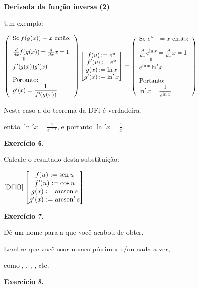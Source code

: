 \documentclass[oneside,12pt]{article}
\begin{document}
\newpage


{\bf Derivada da função inversa (2)}

Um exemplo:

\msk

$\scalebox{0.9}{$
  \DFID
  \bmat{ f(u):=e^u \\ f'(u):=e^u \\ g(x):=\ln x \\ g'(x):=\ln' x } =
  \left(
  \begin{array}{l}
  \text{Se $e^{\ln x}=x$ então:} \\[10pt]
  \frac{d}{dx} e^{\ln x} = \frac{d}{dx} x = 1 \\
  \phantom{mm}\veq \\
  e^{\ln x} \ln' x \\[10pt]
  \text{Portanto:} \\
  \ln' x = \D \frac{1}{e^{\ln x}} \\
  \end{array}
  \right)
  $}
$

\bsk

Neste caso a  do teorema da DFI é verdadeira,

então $\ln' x = \frac{1}{e^{\ln x}}$, e portanto $\ln' x = \frac 1x$.

\newpage


{\bf Exercício 6.}

Calcule o resultado desta substituição:

$\mathsf{[DFID]} \left [\begin{matrix}f(u) := \operatorname{sen} u \\ f'(u) := \cos u \\ g(x) := \operatorname{arcsen} s \\ g'(x) := \operatorname{arcsen}' s\end{matrix}\right ]$

\bsk

{\bf Exercício 7.}

Dê um nome para a  que você acabou de obter.

Lembre que você  usar nomes péssimos e/ou nada a ver,

como , , , , etc.

\bsk

{\bf Exercício 8.}
\end{document}
